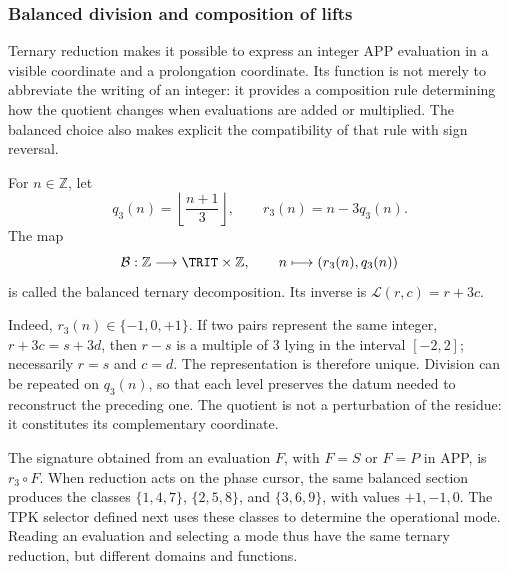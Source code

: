 \subsubsection{Balanced division and composition of lifts}
\label{trit-ampl-div-balanceada}

Ternary reduction makes it possible to express an integer APP evaluation in a
visible coordinate and a prolongation coordinate. Its function is not
merely to abbreviate the writing of an integer: it provides a composition
rule determining how the quotient changes when evaluations are added or
multiplied. The balanced choice also makes explicit
the compatibility of that rule with sign reversal.

\begin{definition}
\label{trit-ampl-def-coordenadas}
For \(n\in\mathbb Z\), let
\[
 q_3(n)=\left\lfloor\frac{n+1}{3}\right\rfloor,\qquad
 r_3(n)=n-3q_3(n).
\]
The map
\[
 \mathcal B:\mathbb Z\longrightarrow\TRIT\times\mathbb Z,\qquad
 n\longmapsto(r_3(n),q_3(n))
\]
is called the balanced ternary decomposition. Its inverse is
\(\mathcal L(r,c)=r+3c\).
\end{definition}

Indeed, \(r_3(n)\in\{-1,0,+1\}\). If two pairs represent the same integer,
\(r+3c=s+3d\), then \(r-s\) is a multiple of \(3\) lying in the interval
\([-2,2]\); necessarily \(r=s\) and \(c=d\). The representation is therefore
unique. Division can be repeated on \(q_3(n)\), so that each level
preserves the datum needed to reconstruct the preceding one. The quotient is not a
perturbation of the residue: it constitutes its complementary coordinate.

The signature obtained from an evaluation \(F\), with \(F=S\) or \(F=P\) in APP,
is \(r_3\circ F\). When reduction acts on the phase cursor, the same
balanced section produces the classes \(\{1,4,7\}\), \(\{2,5,8\}\), and
\(\{3,6,9\}\), with values \(+1,-1,0\). The TPK selector defined
next uses these classes to determine the operational mode.
Reading an evaluation and selecting a mode thus have the same
ternary reduction, but different domains and functions.

